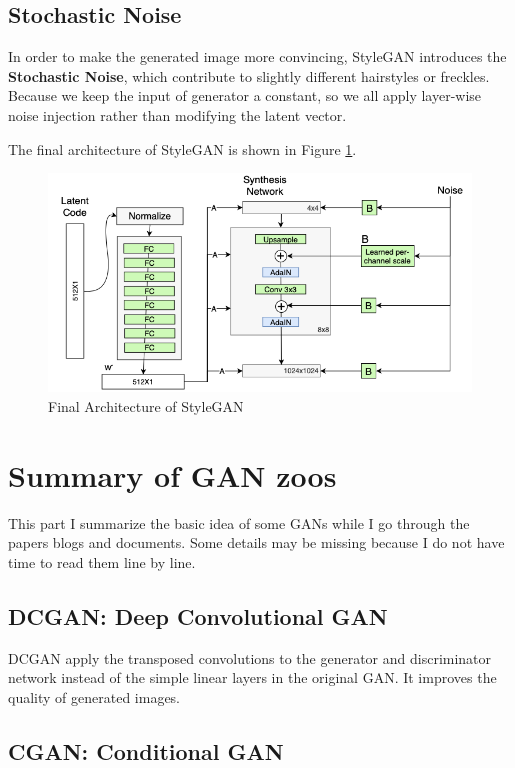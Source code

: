\documentclass{article} %
\begin{document}
\subsection{Stochastic Noise}

In order to make the generated image more convincing, StyleGAN introduces the \textbf{Stochastic Noise}, which contribute to slightly different hairstyles or freckles. Because we keep the input of generator a constant, so we all apply layer-wise noise injection rather than modifying the latent vector. 

The final architecture of StyleGAN is shown in Figure \ref{fig:FinalArchitectureofStyleGAN}.

\begin{figure}[h]
	\centering
	\includegraphics[width=0.85\linewidth]{figures/FinalStyleGAN.png}
	\caption{Final Architecture of StyleGAN}
	\label{fig:FinalArchitectureofStyleGAN}
\end{figure}

\section{Summary of GAN zoos}

This part I summarize the basic idea of some GANs while I go through the papers blogs and documents. Some details may be missing because I do not have time to read them line by line.

\subsection{DCGAN: Deep Convolutional GAN}

DCGAN apply the transposed convolutions to the generator and discriminator network instead of the simple linear layers in the original GAN. It improves the quality of generated images.

\subsection{CGAN: Conditional GAN}
\end{document}
